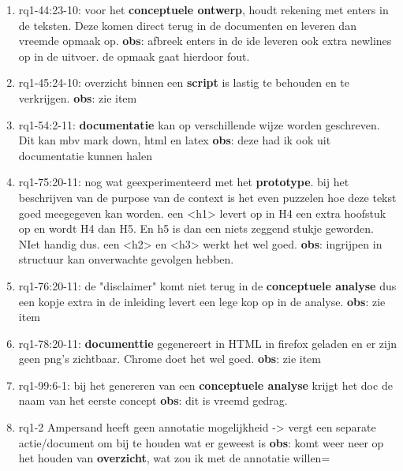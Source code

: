 \begin{enumerate}
    \item rq1-44:23-10: voor het \textbf{conceptuele ontwerp}, houdt rekening met enters in de teksten. Deze komen direct terug in de documenten en leveren dan vreemde opmaak op.
    \newline\textbf{obs}: afbreek enters in de \acrshort{ide} leveren ook extra newlines op in de uitvoer. de opmaak gaat hierdoor fout.
    
    \item rq1-45:24-10: overzicht     binnen een \textbf{script} is lastig te behouden en te verkrijgen.
    \newline\textbf{obs}: zie item
    
    \item rq1-54:2-11: \textbf{documentatie} kan op verschillende wijze worden geschreven. Dit kan mbv mark down, html en latex
    \newline\textbf{obs}: deze had ik ook uit documentatie kunnen halen

    \item rq1-75:20-11: nog wat geexperimenteerd met het \textbf{prototype}. 
    bij het beschrijven van de purpose van de context is het even puzzelen hoe deze tekst goed meegegeven kan worden. 
    een <h1> levert op in H4 een extra hoofstuk op en wordt H4 dan H5. En h5 is dan een niets zeggend stukje geworden. NIet handig dus.
    een <h2> en <h3> werkt het wel goed.
    \newline\textbf{obs}: ingrijpen in structuur kan onverwachte gevolgen hebben.
    
    \item rq1-76:20-11: de "disclaimer" komt niet terug in de \textbf{conceptuele analyse} dus een kopje extra in de inleiding levert een lege kop op in de analyse.
    \newline\textbf{obs}: zie item
    
    \item rq1-78:20-11: \textbf{documenttie} gegenereert in HTML in firefox geladen en er zijn geen png's zichtbaar. Chrome doet het wel goed.
    \newline\textbf{obs}: zie item
    
    \item rq1-99:6-1: bij het genereren van een \textbf{conceptuele analyse} krijgt het doc de naam van het eerste concept
    \newline\textbf{obs}: dit is vreemd gedrag.     
    
    \item rq1-2 Ampersand heeft geen annotatie mogelijkheid -> vergt een separate actie/document om bij te houden wat er geweest is
    \newline\textbf{obs}: komt weer neer op het houden van \textbf{overzicht}, wat zou ik met de annotatie willen=
    
\end{enumerate}

